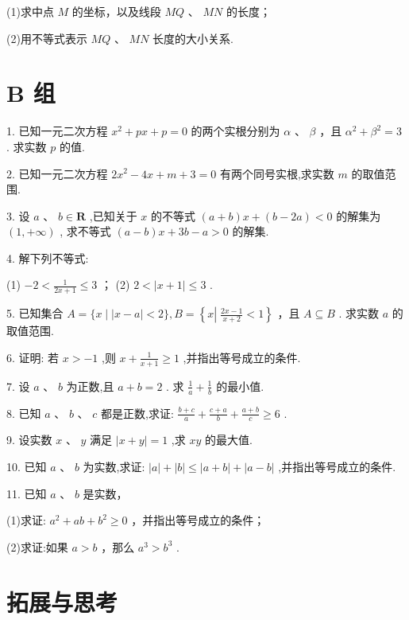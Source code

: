 \documentclass[10pt]{article}
\begin{document}
(1)求中点 \(M\) 的坐标，以及线段 \({MQ}\) 、 \({MN}\) 的长度；

(2)用不等式表示 \({MQ}\) 、 \({MN}\) 长度的大小关系.

\section*{B 组}

1. 已知一元二次方程 \({x}^{2} + {px} + p = 0\) 的两个实根分别为 \(\alpha\) 、 \(\beta\) ，且 \({\alpha }^{2} + {\beta }^{2} = 3\) . 求实数 \(p\) 的值.

2. 已知一元二次方程 \(2{x}^{2} - {4x} + m + 3 = 0\) 有两个同号实根,求实数 \(m\) 的取值范围.

3. 设 \(a\text{ 、 }b \in  \mathbf{R}\) ,已知关于 \(x\) 的不等式 \(\left( {a + b}\right) x + \left( {b - {2a}}\right)  < 0\) 的解集为 \(\left( {1, + \infty }\right)\) , 求不等式 \(\left( {a - b}\right) x + {3b} - a > 0\) 的解集.

4. 解下列不等式:

(1) \(- 2 < \frac{1}{{2x} + 1} \leq  3\) ； (2) \(2 < \left| {x + 1}\right|  \leq  3\) .

5. 已知集合 \(A = \{ x \mid  \left| {x - a}\right|  < 2\} ,B = \left\{  {x\left| {\;\frac{{2x} - 1}{x + 2} < 1}\right. }\right\}\) ，且 \(A \subseteq  B\) . 求实数 \(a\) 的取值范围.

6. 证明: 若 \(x >  - 1\) ,则 \(x + \frac{1}{x + 1} \geq  1\) ,并指出等号成立的条件.

7. 设 \(a\text{ 、 }b\) 为正数,且 \(a + b = 2\) . 求 \(\frac{1}{a} + \frac{1}{b}\) 的最小值.

8. 已知 \(a\text{ 、 }b\text{ 、 }c\) 都是正数,求证: \(\frac{b + c}{a} + \frac{c + a}{b} + \frac{a + b}{c} \geq  6\) .

9. 设实数 \(x\text{ 、 }y\) 满足 \(\left| {x + y}\right|  = 1\) ,求 \({xy}\) 的最大值.

10. 已知 \(a\text{ 、 }b\) 为实数,求证: \(\left| a\right|  + \left| b\right|  \leq  \left| {a + b}\right|  + \left| {a - b}\right|\) ,并指出等号成立的条件.

11. 已知 \(a\text{ 、 }b\) 是实数，

(1)求证: \({a}^{2} + {ab} + {b}^{2} \geq  0\) ，并指出等号成立的条件；

(2)求证:如果 \(a > b\) ，那么 \({a}^{3} > {b}^{3}\) .

\section*{拓展与思考}
\end{document}
